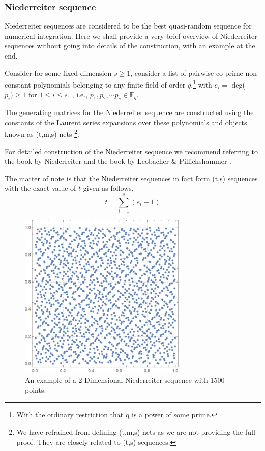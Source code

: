 \documentclass[12pt]{article}
\numberwithin{equation}{section}
\begin{document}
\subsubsection{Niederreiter sequence}
Niederreiter sequences are considered to be the best quasi-random sequence for numerical integration. Here we shall provide a very brief overview of Niederreiter sequences \cite{lowdiscrepancyNIEDERREITER198851, exactnied} without going into details of the construction, with an example at the end.
\par Consider for some fixed dimension $s\geq 1$, consider a list of pairwise co-prime non-constant polynomials belonging to any finite field of order $q$,\footnote{With the ordinary restriction that q is a power of some prime.} with $e_i=$ deg($p_i)\geq 1$ for $1 \leq i \leq s.$ , i.e., $p_1, p_2, \cdots p_s \in \mathbb{F}_q$.
\par The generating matrices for the Niederreiter sequence are constructed using the constants of the Laurent series expansions over these polynomials and objects known as (t,m,s) nets \footnote{We have refrained from defining (t,m,s) nets as we are not providing the full proof. They are closely related to (t,s) sequences.}.
\par For detailed construction of the Niederreiter sequence we recommend referring to the book by Niederreiter \cite{kuipers1974uniform} and the book by Leobacher \& Pillichshammer \cite{leobacher}.\par The matter of note is that the Niederreiter sequences in fact form (t,s) sequences with the exact value of $t$ given as follows,
$$ t= \sum_{i=1}^{s}(e_i-1) $$
\begin{figure}[!htb]
    \centering
    \includegraphics[width=8cm]{Images/1500neiederreiter.png}
    \caption{An example of a 2-Dimensional Niederreiter sequence with 1500 points.}
    \label{fig:2dexamplenied}
\end{figure}
\end{document}

